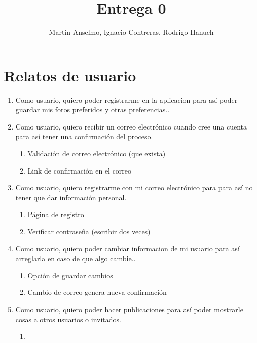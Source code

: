 \documentclass[12pt, letterpaper, notitlepage]{article}
\title{\textbf{Entrega 0}}
\author{Martín Anselmo, Ignacio Contreras, Rodrigo Hanuch}
\begin{document}
	
	\clearpage\maketitle
	\thispagestyle{empty}
	
	\newpage
	
	\section*{Relatos de usuario}
	\newcommand{\story}[3]{Como {#1}, quiero {#2} para {#3}.}
	
	\begin{enumerate}
		
		\item \story{usuario}{poder registrarme en la aplicacion}	
		{así poder guardar mis foros preferidos y otras preferencias.}
		
		
		\item \story{usuario}{recibir un correo electrónico cuando cree una cuenta}	
		{así tener una confirmación del proceso}
		\begin{enumerate}
			\item Validación de correo electrónico (que exista)
			\item Link de confirmación en el correo		
		\end{enumerate}
		
		\item \story{usuario}{registrarme con mi correo electrónico}{para así no tener que 
			dar información personal}
		\begin{enumerate}
			\item Página de registro
			\item Verificar contraseña (escribir dos veces)
		\end{enumerate}
		
		
		\item \story{usuario}{poder cambiar informacion de mi usuario}{así arreglarla en caso de que algo cambie.}
		\begin{enumerate}
			\item Opción de guardar cambios
			\item Cambio de correo genera nueva confirmación
		\end{enumerate}
		
		
		\item \story{usuario}{poder hacer publicaciones}{así poder mostrarle cosas a otros usuarios o invitados}
		\begin{enumerate}
			\item
		\end{enumerate}
		

\end{enumerate}
\end{document}
